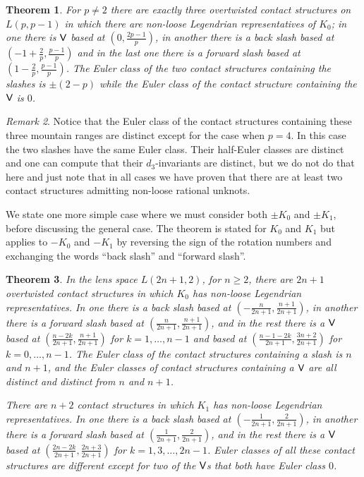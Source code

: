 \documentclass[11pt]{amsart}
\theoremstyle{plain}
\newtheorem{theorem}{Theorem}
\theoremstyle{definition}
\theoremstyle{remark}
\newtheorem{remark}[theorem]{Remark}
\numberwithin{theorem}{section}
\begin{document}
\begin{theorem}\label{Lpp1}
  For $p\not=2$ there are exactly three overtwisted contact structures on $L(p,p-1)$ in which there are non-loose Legendrian representatives of $K_0$; in one there is $\normalfont\textsf{V}$ based at $\left(0, \frac{2p-1}p\right)$, in another there is a back slash based at $\left(-1+\frac 2p, \frac{p-1}p\right)$ and in the last one there is a forward slash based at $\left(1-\frac 2p, \frac{p-1}p\right)$. The Euler class of the two contact structures containing the slashes is $\pm (2-p)$ while the Euler class of the contact structure containing the $\normalfont\textsf{V}$ is $0$. 
\end{theorem}

\begin{remark}
  Notice that the Euler class of the contact structures containing these three mountain ranges are distinct except for the case when $p=4$. In this case the two slashes have the same Euler class. Their half-Euler classes are distinct and one can compute that their $d_3$-invariants are distinct, but we do not do that here and just note that in all cases we have proven that there are at least two contact structures admitting non-loose rational unknots. 
\end{remark}

We state one more simple case where we must consider both $\pm K_0$ and $\pm K_1$, before discussing the general case. The theorem is stated for $K_0$ and $K_1$ but applies to $-K_0$ and $-K_1$ by reversing the sign of the rotation numbers and exchanging the words ``back slash'' and ``forward slash''.
\begin{theorem}\label{l2n12}
In the lens space $L(2n+1,2)$, for $n\geq 2$, there are $2n+1$ overtwisted contact structures in which $K_0$ has non-loose Legendrian representatives. In one there is a back slash based at $\left(-\frac n{2n+1}, \frac{n+1}{2n+1}\right)$, in another there is a forward slash based at $\left(\frac n{2n+1}, \frac{n+1}{2n+1}\right)$, and in the rest there is a $\normalfont\textsf{V}$ based at $\left(\frac{n-2k}{2n+1}, \frac{n+1}{2n+1}\right)$ for $k=1, \ldots, n-1$ and based at $\left( \frac{n-1-2k}{2n+1},\frac{3n+2}{2n+1}\right)$ for $k=0,\ldots, n-1$. The Euler class of the contact structures containing a slash is $n$ and $n+1$, and the Euler classes of contact structures containing a $\normalfont\textsf{V}$ are all distinct and distinct from $n$ and $n+1$. 

There are $n+2$ contact structures in which $K_1$ has non-loose Legendrian representatives. In one there is a back slash based at $\left(-\frac 1{2n+1}, \frac 2{2n+1}\right)$, in another there is a forward slash based at $\left(\frac 1{2n+1}, \frac 2{2n+1}\right)$, and in the rest there is a $\normalfont\textsf{V}$ based at $\left(\frac{2n-2k}{2n+1}, \frac{2n+3}{2n+1}\right)$ for $k=1,3,\ldots, 2n-1$. Euler classes of all these contact structures are different except for two of the $\normalfont\textsf{V}$s that both have Euler class $0$. 
\end{theorem}
\end{document}
